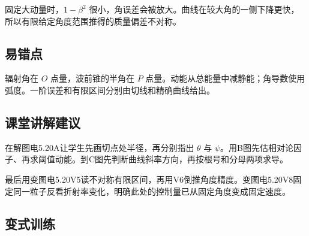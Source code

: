 \documentclass[UTF8,fontset=fandol,a4paper,11pt]{ctexart}
\begin{document}
固定大动量时，$1-\beta^2$ 很小，角误差会被放大。曲线在较大角的一侧下降更快，所以有限给定角度范围推得的质量偏差不对称。



\subsection*{易错点}

辐射角在 $O$ 点量，波前锥的半角在 $P$ 点量。动能从总能量中减静能；角导数使用弧度。一阶误差和有限区间分别由切线和精确曲线给出。



\subsection*{课堂讲解建议}

在解图电5.20A让学生先画切点处半径，再分别指出 $\theta$ 与 $\psi$。用B图先估相对论因子、再求阈值动能。到C图先判断曲线斜率方向，再按根号和分母两项求导。

最后用变图电5.20V5读不对称有限区间，再用V6倒推角度精度。变图电5.20V8固定同一粒子反看折射率变化，明确此处的控制量已从固定角度变成固定速度。


\subsection*{变式训练}
\end{document}
